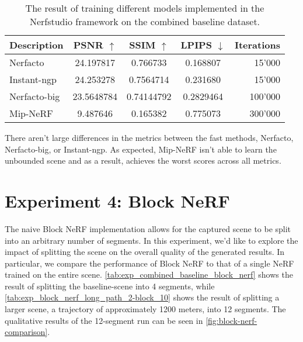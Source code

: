 \begin{table}[ht]
\centering
\setlength{\tabcolsep}{6pt}
\renewcommand{\arraystretch}{1.5}
\begin{tabular}{l | C{2.2} C{1.3} C{1.3} | r}
\hline
\textbf{Description} & \textbf{PSNR $\uparrow$} & \textbf{SSIM $\uparrow$} & \textbf{LPIPS $\downarrow$} & Iterations \\
\hline
Nerfacto        & 24.197817                     & 0.766733     & 0.168807 & 15'000 \\
Instant-ngp     & 24.253278   & 0.7564714                     & 0.231680 & 15'000 \\
Nerfacto-big    & 23.5648784     & 0.74144792     & 0.2829464 & 100'000 \\
Mip-NeRF        & 9.487646 & 0.165382 & 0.775073 & 300'000 \\
\hline
\end{tabular}
\caption{The result of training different models implemented in the Nerfstudio framework on the combined baseline dataset.}
\label{tab:different-models}
\end{table}

There aren't large differences in the metrics between the fast methods, Nerfacto, Nerfacto-big, or Instant-ngp. As expected, Mip-NeRF isn't able to learn the unbounded scene and as a result, achieves the worst scores across all metrics.










\section{Experiment 4: Block NeRF}

The naive Block NeRF implementation allows for the captured scene to be split into an arbitrary number of segments. In this experiment, we'd like to explore the impact of splitting the scene on the overall quality of the generated results. In particular, we compare the performance of Block NeRF to that of a single NeRF trained on the entire scene. \autoref{tab:exp_combined_baseline_block_nerf} shows the result of splitting the baseline-scene into 4 segments, while \autoref{tab:exp_block_nerf_long_path_2-block_10} shows the result of splitting a larger scene, a trajectory of approximately 1200 meters, into 12 segments. The qualitative results of the 12-segment run can be seen in \autoref{fig:block-nerf-comparison}.

